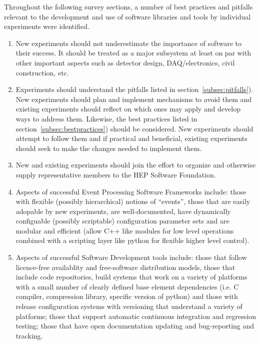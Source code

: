 Throughout the following survey sections, a number of best practices
and pitfalls relevant to the development and use of software libraries
and tools by individual experiments were identified.

\begin{enumerate}

\item New experiments should not underestimate the importance of
  software to their success.  It should be treated as a major
  subsystem at least on par with other important aspects such as
  detector design, DAQ/electronics, civil construction, etc.

\item Experiments should understand the pitfalls listed in
  section~\ref{subsec:pitfalls}).  New experiments should plan and
  implement mechanisms to avoid them and existing experiments should
  reflect on which ones may apply and develop ways to address them.
  Likewise, the best practices listed in
  section~\ref{subsec:bestpractices}) should be considered.  New
  experiments should attempt to follow them and if practical and
  beneficial, existing experiments should seek to make the changes
  needed to implement them.

\item New and existing experiments should join the effort to organize
  and otherwise supply representative members to the HEP Software
  Foundation.

\item Aspects of successful Event Processing Software Frameworks include: 
those with flexible (possibly hierarchical) notions of ``events'', 
those that are easily adopable by new experiments, are well-documented, 
have dynamically configuable (possibly scriptable) configuration 
parameter sets and are modular and efficient (allow C++ like modules 
for low level 
operations combined with a scripting layer like python for flexible 
higher level control).

\item Aspects of successful Software Development tools include:
those that follow licence-free availablity and free-software distribution models, 
those that include code repositories, build systems that work on a variety of platforms 
with a small number of clearly defined base element dependencies 
(i.e. C compiler, compression library, specific version of python) and those with release 
configuration systems with versioning that understand a variety of 
platforms; those that support automatic continuous integration and 
regression testing; those that have open documentation updating and  
bug-reporting and tracking.


\end{enumerate}

